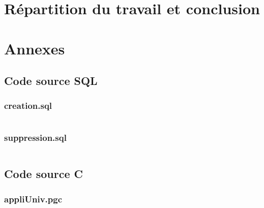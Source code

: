 \documentclass[12pt,titlepage,a4paper]{report}
\begin{document}
	\chapter{Répartition du travail et conclusion}
		

	\chapter{Annexes}
		\section{Code source SQL}
			\subsection{creation.sql}
			\inputminted[tabsize=4,linenos,fontsize=\small]{sql}{../src/SQL/creation.sql}

			\subsection{suppression.sql}		
			\inputminted[tabsize=4,linenos,fontsize=\small]{sql}{../src/SQL/suppression.sql}

		\section{Code source C}
			\subsection{appliUniv.pgc}
			\inputminted[tabsize=4,linenos,fontsize=\small]{sql}{../src/C/appliUniv.pgc}
\end{document}
